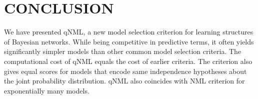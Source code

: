 \section{CONCLUSION}

We have presented qNML, a new model selection criterion for learning
structures of Bayesian networks.  While being competitive in
predictive terms, it often yields significantly simpler models than
other common model selection criteria.  The computational cost of qNML
equals the cost of earlier criteria.  The criterion also gives equal
scores for models that encode same independence hypotheses about the
joint probability distribution.  qNML also coincides with NML
criterion for exponentially many models.
